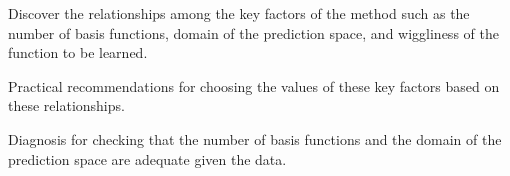 \documentclass[portrait,a1,final]{a0poster} %
\let\tempone\itemize
\let\temptwo\enditemize
\renewenvironment{itemize}{\tempone\addtolength{\itemsep}{-0.3\baselineskip}}{\temptwo}
\begin{document}
\begin{minipage}{1\linewidth}
\begin{minipage}[t]{0.48\linewidth}
\begin{itemize}
\end{itemize}

\vspace{-5mm}
\hspace{1mm}
\centering  %
\begin{tcolorbox}[colframe=blue!20, colback=white, title={\scriptsize \color{black!80} Our contribution:}\; A performance analysis for the practical implementation of this reduce-rank GP (HSGP), colbacktitle=lightblue, coltitle=black, boxrule=0.5pt, width=0.98\textwidth]
	\begin{itemize}\setlength\itemsep{2mm}
	\item {\color{navyblue} Discover the relationships} among the key factors of the method such as the number of basis functions, domain of the prediction space, and wiggliness of the function to be learned.
	\item {\color{navyblue} Practical recommendations} for choosing the values of these key factors based on these relationships. %
	\item {\color{navyblue} Diagnosis} for checking that the number of basis functions and the domain of the prediction space are adequate given the data.
	\end{itemize}
\end{tcolorbox}




\end{minipage}
\end{minipage}
\end{document}
